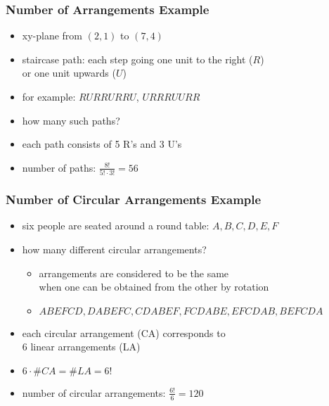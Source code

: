 \documentclass[dvipsnames]{beamer}
\begin{document}
\begin{frame}
  \frametitle{Number of Arrangements Example}

  \begin{example}
    \begin{itemize}
      \item xy-plane from $(2,1)$ to $(7,4)$
      \item staircase path: each step going one unit to the right ($R$)\\
        or one unit upwards ($U$)
      \item for example: $RURRURRU$, $URRRUURR$
      \item how many such paths?

      \pause
      \medskip
      \item each path consists of 5 R's and 3 U's
      \item number of paths: $\frac{8!}{5! \cdot 3!} = 56$
    \end{itemize}
  \end{example}
\end{frame}

\begin{frame}
  \frametitle{Number of Circular Arrangements Example}

  \begin{example}
    \begin{itemize}
      \item six people are seated around a round table: $A,B,C,D,E,F$
      \item how many different circular arrangements?
      \begin{itemize}
        \item arrangements are considered to be the same\\
          when one can be obtained from the other by rotation
        \item $ABEFCD, DABEFC, CDABEF, FCDABE, EFCDAB, BEFCDA$
      \end{itemize}

      \pause
      \medskip
      \item each circular arrangement (CA) corresponds to\\
        6 linear arrangements (LA)
      \item $6 \cdot \#CA = \#LA = 6!$
      \item number of circular arrangements: $\frac{6!}{6} = 120$
    \end{itemize}
  \end{example}
\end{frame}
\end{document}
